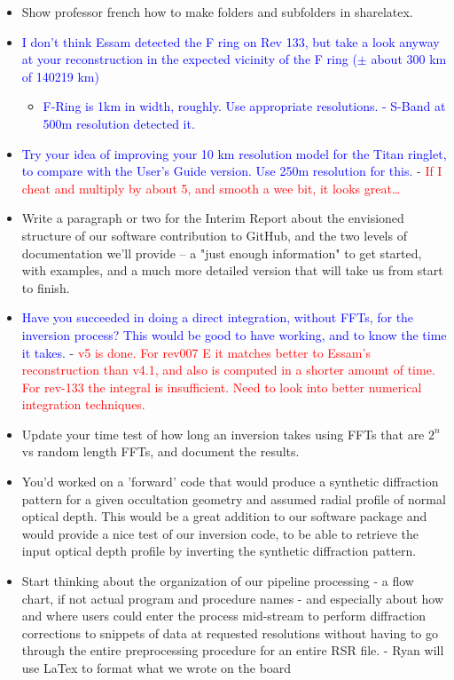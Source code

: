 \documentclass[crop=false,class=book]{standalone}
\begin{document}
\begin{itemize}
\begin{itemize}
    \end{itemize}
    \item Show professor french how to make folders and subfolders in sharelatex.
    \item \textcolor{blue}{I don't think Essam detected the F ring on Rev 133, but take a look anyway at your reconstruction in the expected vicinity of the F ring ($\pm$ about 300 km of 140219 km)}
    \begin{itemize}
        \item \textcolor{blue}{F-Ring is 1km in width, roughly. Use appropriate resolutions. - S-Band at 500m resolution detected it.}
    \end{itemize}
    \item \textcolor{blue}{Try your idea of improving your 10 km resolution model for the Titan ringlet, to compare with the User's Guide version. Use 250m resolution for this.} - \textcolor{red}{If I cheat and multiply by about 5, and smooth a wee bit, it looks great…}
    \item Write a paragraph or two for the Interim Report about the envisioned structure of our software contribution to GitHub, and the two levels of documentation we'll provide -- a "just enough information" to get started, with examples, and a much more detailed version that will take us from start to finish.
    \item \textcolor{blue}{Have you succeeded in doing a direct integration, without FFTs, for the inversion process? This would be good to have working, and to know the time it takes.} - \textcolor{red}{v5 is done. For rev007 E it matches better to Essam’s reconstruction than v4.1, and also is computed in a shorter amount of time. For rev-133 the integral is insufficient. Need to look into better numerical integration techniques.}
    \item Update your time test of how long an inversion takes using FFTs that are $2^n$ vs random length FFTs, and document the results.
    \item You'd worked on a 'forward' code that would produce a synthetic diffraction pattern for a given occultation geometry and assumed radial profile of normal optical depth. This would be a great addition to our software package and would provide a nice test of our inversion code, to be able to retrieve the input optical depth profile by inverting the synthetic diffraction pattern.
    \item Start thinking about the organization of our pipeline processing - a flow chart, if not actual program and procedure names - and especially about how and where users could enter the process mid-stream to perform diffraction corrections to snippets of data at requested resolutions without having to go through the entire preprocessing procedure for an entire RSR file. - Ryan will use LaTex to format what we wrote on the board

\end{itemize}
\end{document}
